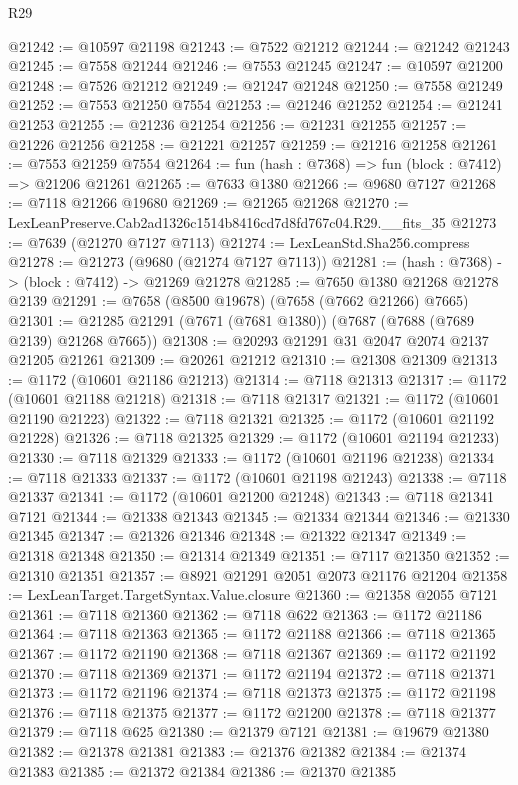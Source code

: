\begin{lexlean}{R29}
\begin{coremodule}
@21242 := @10597 @21198
@21243 := @7522 @21212
@21244 := @21242 @21243
@21245 := @7558 @21244
@21246 := @7553 @21245
@21247 := @10597 @21200
@21248 := @7526 @21212
@21249 := @21247 @21248
@21250 := @7558 @21249
@21252 := @7553 @21250 @7554
@21253 := @21246 @21252
@21254 := @21241 @21253
@21255 := @21236 @21254
@21256 := @21231 @21255
@21257 := @21226 @21256
@21258 := @21221 @21257
@21259 := @21216 @21258
@21261 := @7553 @21259 @7554
@21264 := fun (hash : @7368) => fun (block : @7412) => @21206 @21261
@21265 := @7633 @1380
@21266 := @9680 @7127
@21268 := @7118 @21266 @19680
@21269 := @21265 @21268
@21270 := LexLeanPreserve.Cab2ad1326c1514b8416cd7d8fd767c04.R29.__fits_35
@21273 := @7639 (@21270 @7127 @7113)
@21274 := LexLeanStd.Sha256.compress
@21278 := @21273 (@9680 (@21274 @7127 @7113))
@21281 := (hash : @7368) -> (block : @7412) -> @21269 @21278
@21285 := @7650 @1380 @21268 @21278 @2139
@21291 := @7658 (@8500 @19678) (@7658 (@7662 @21266) @7665)
@21301 := @21285 @21291 (@7671 (@7681 @1380)) (@7687 (@7688 (@7689 @2139) @21268 @7665))
@21308 := @20293 @21291 @31 @2047 @2074 @2137 @21205 @21261
@21309 := @20261 @21212
@21310 := @21308 @21309
@21313 := @1172 (@10601 @21186 @21213)
@21314 := @7118 @21313
@21317 := @1172 (@10601 @21188 @21218)
@21318 := @7118 @21317
@21321 := @1172 (@10601 @21190 @21223)
@21322 := @7118 @21321
@21325 := @1172 (@10601 @21192 @21228)
@21326 := @7118 @21325
@21329 := @1172 (@10601 @21194 @21233)
@21330 := @7118 @21329
@21333 := @1172 (@10601 @21196 @21238)
@21334 := @7118 @21333
@21337 := @1172 (@10601 @21198 @21243)
@21338 := @7118 @21337
@21341 := @1172 (@10601 @21200 @21248)
@21343 := @7118 @21341 @7121
@21344 := @21338 @21343
@21345 := @21334 @21344
@21346 := @21330 @21345
@21347 := @21326 @21346
@21348 := @21322 @21347
@21349 := @21318 @21348
@21350 := @21314 @21349
@21351 := @7117 @21350
@21352 := @21310 @21351
@21357 := @8921 @21291 @2051 @2073 @21176 @21204
@21358 := LexLeanTarget.TargetSyntax.Value.closure
@21360 := @21358 @2055 @7121
@21361 := @7118 @21360
@21362 := @7118 @622
@21363 := @1172 @21186
@21364 := @7118 @21363
@21365 := @1172 @21188
@21366 := @7118 @21365
@21367 := @1172 @21190
@21368 := @7118 @21367
@21369 := @1172 @21192
@21370 := @7118 @21369
@21371 := @1172 @21194
@21372 := @7118 @21371
@21373 := @1172 @21196
@21374 := @7118 @21373
@21375 := @1172 @21198
@21376 := @7118 @21375
@21377 := @1172 @21200
@21378 := @7118 @21377
@21379 := @7118 @625
@21380 := @21379 @7121
@21381 := @19679 @21380
@21382 := @21378 @21381
@21383 := @21376 @21382
@21384 := @21374 @21383
@21385 := @21372 @21384
@21386 := @21370 @21385

\end{coremodule}
\end{lexlean}

